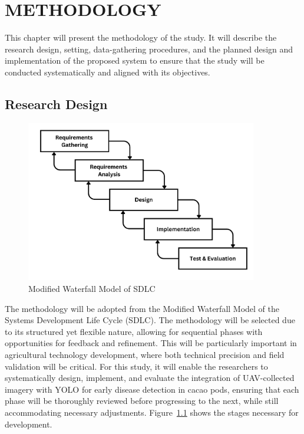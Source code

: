 \chapter{METHODOLOGY}

This chapter will present the methodology of the study. It will describe the research design, setting, data-gathering procedures, and the planned design and implementation of the proposed system to ensure that the study will be conducted systematically and aligned with its objectives.

\section{Research Design}
\begin{figure}[H]
	\centering
	\caption{Modified Waterfall Model of SDLC}
	\label{fig:waterfall}
	\includegraphics[width=0.9\textwidth]{figures/Waterfall.pdf}
\end{figure}

The methodology will be adopted from the Modified Waterfall Model of the Systems Development Life Cycle (SDLC). The methodology will be selected due to its structured yet flexible nature, allowing for sequential phases with opportunities for feedback and refinement. This will be particularly important in agricultural technology development, where both technical precision and field validation will be critical. For this study, it will enable the researchers to systematically design, implement, and evaluate the integration of UAV-collected imagery with YOLO for early disease detection in cacao pods, ensuring that each phase will be thoroughly reviewed before progressing to the next, while still accommodating necessary adjustments. Figure~\ref{fig:waterfall} shows the stages necessary for development.

